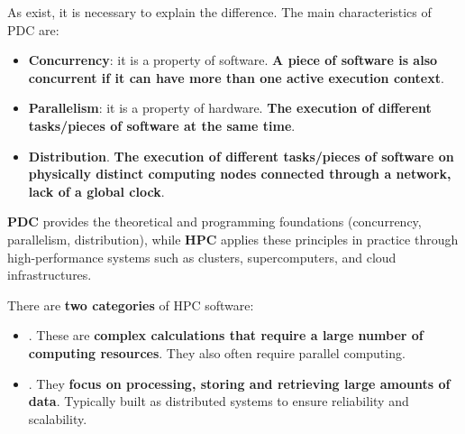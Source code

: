 \noindent
As  exist, it is necessary to explain the difference. The main characteristics of PDC are:
\begin{itemize}
    \item \textbf{Concurrency}: it is a property of software. \textbf{A piece of software is also concurrent if it can have more than one active execution context}.

    \item \textbf{Parallelism}: it is a property of hardware. \textbf{The execution of different tasks/pieces of software at the same time}.

    \item \textbf{Distribution}. \textbf{The execution of different tasks/pieces of software on physically distinct computing nodes connected through a network, lack of a global clock}.
\end{itemize}
\textbf{PDC} provides the theoretical and programming foundations (concurrency, parallelism, distribution), while \textbf{HPC} applies these principles in practice through high-performance systems such as clusters, supercomputers, and cloud infrastructures.

\newpage

\noindent
There are \textbf{two categories} of HPC software:
\begin{itemize}
    \item {}. These are \textbf{complex calculations that require a large number of computing resources}. They also often require parallel computing.

    \item {}. They \textbf{focus on processing, storing and retrieving large amounts of data}. Typically built as distributed systems to ensure reliability and scalability.
\end{itemize}